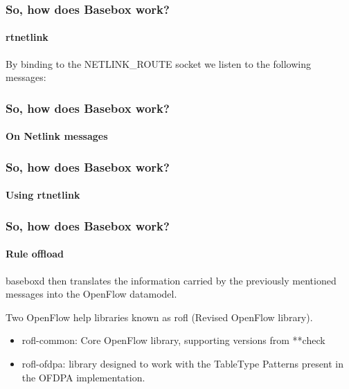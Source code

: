 \documentclass[11pt]{beamer}
\begin{document}
\begin{frame}
\begin{frame}
\end{frame}

\begin{frame}
\frametitle{So, how does Basebox work?}
\framesubtitle{rtnetlink}

By binding to the NETLINK\_ROUTE socket we listen to the following messages:

{%
\small
{}}

\end{frame}

\begin{frame}
\frametitle{So, how does Basebox work?}
\framesubtitle{On Netlink messages}


\end{frame}

\begin{frame}
\frametitle{So, how does Basebox work?}
\framesubtitle{Using rtnetlink}



\end{frame}

\begin{frame}
\frametitle{So, how does Basebox work?}
\framesubtitle{Rule offload}

baseboxd then translates the information carried by the previously mentioned messages into the OpenFlow datamodel. 

Two OpenFlow help libraries known as rofl (Revised OpenFlow library).
\begin{itemize}
\item rofl-common: Core OpenFlow library, supporting versions from **check
\item rofl-ofdpa: library designed to work with the TableType Patterns present in the OFDPA implementation.
\end{itemize}
\end{frame}


\end{frame}
\end{document}
